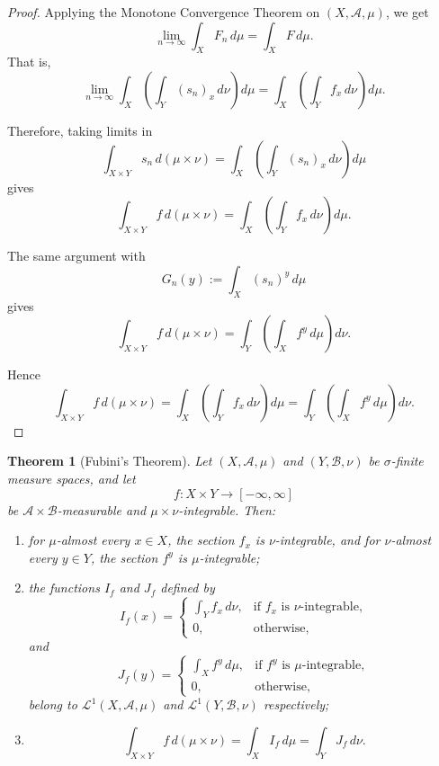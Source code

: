 \documentclass[12pt]{article}
\newtheorem{theorem}{Theorem}
\begin{document}
\begin{proof}
Applying the Monotone Convergence Theorem on \((X,\mathcal A,\mu)\), we get
\[
\lim_{n\to\infty}
\int_X F_n\,d\mu
=
\int_X F\,d\mu.
\]
That is,
\[
\lim_{n\to\infty}
\int_X\left(\int_Y (s_n)_x\,d\nu\right)d\mu
=
\int_X\left(\int_Y f_x\,d\nu\right)d\mu.
\]

Therefore, taking limits in
\[
\int_{X\times Y} s_n\,d(\mu\times\nu)
=
\int_X\left(\int_Y (s_n)_x\,d\nu\right)d\mu
\]
gives
\[
\int_{X\times Y} f\,d(\mu\times\nu)
=
\int_X\left(\int_Y f_x\,d\nu\right)d\mu.
\]

The same argument with
\[
G_n(y):=\int_X (s_n)^y\,d\mu
\]
gives
\[
\int_{X\times Y} f\,d(\mu\times\nu)
=
\int_Y\left(\int_X f^y\,d\mu\right)d\nu.
\]

Hence
\[
\int_{X\times Y} f\,d(\mu\times\nu)
=
\int_X\left(\int_Y f_x\,d\nu\right)d\mu
=
\int_Y\left(\int_X f^y\,d\mu\right)d\nu.
\]
\end{proof}

\begin{theorem}[Fubini's Theorem]
Let $(X,\mathcal{A},\mu)$ and $(Y,\mathcal{B},\nu)$ be $\sigma$-finite measure
spaces, and let
\[
f:X\times Y\to[-\infty,\infty]
\]
be $\mathcal{A}\times\mathcal{B}$-measurable and $\mu\times\nu$-integrable.
Then:
\begin{enumerate}[label=(\alph*)]
    \item for $\mu$-almost every $x\in X$, the section $f_x$ is
    $\nu$-integrable, and for $\nu$-almost every $y\in Y$, the section $f^y$
    is $\mu$-integrable;

    \item the functions $I_f$ and $J_f$ defined by
    \[
    I_f(x)=
    \begin{cases}
    \displaystyle \int_Y f_x\,d\nu, & \text{if } f_x \text{ is } \nu\text{-integrable},\\
    0, & \text{otherwise},
    \end{cases}
    \]
    and
    \[
    J_f(y)=
    \begin{cases}
    \displaystyle \int_X f^y\,d\mu, & \text{if } f^y \text{ is } \mu\text{-integrable},\\
    0, & \text{otherwise},
    \end{cases}
    \]
    belong to $\mathcal{L}^1(X,\mathcal{A},\mu)$ and
    $\mathcal{L}^1(Y,\mathcal{B},\nu)$ respectively;

    \item
    \[
    \int_{X\times Y} f\,d(\mu\times\nu)
    =
    \int_X I_f\,d\mu
    =
    \int_Y J_f\,d\nu.
    \]
\end{enumerate}
\end{theorem}
\end{document}
